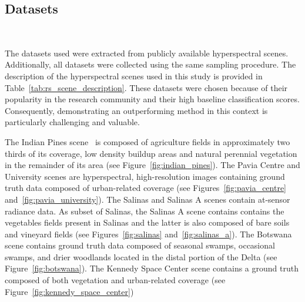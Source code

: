 \documentclass[parskip=full]{scrartcl}
\begin{document}
\subsection{Datasets}~\label{sec:datasets}

The datasets used were extracted from publicly available hyperspectral scenes.
Additionally, all datasets were collected using the same sampling procedure. The
description of the hyperspectral scenes used in this study is provided in
Table~\ref{tab:rs_scene_description}. These datasets were chosen because of
their popularity in the research community and their high baseline
classification scores. Consequently, demonstrating an outperforming method in
this context is particularly challenging and valuable.


The Indian Pines scene~\cite{Baumgardner2015} is composed of agriculture fields
in approximately two thirds of its coverage, low density buildup areas and
natural perennial vegetation in the remainder of its area (see
Figure~\ref{fig:indian_pines}). The Pavia Centre and University scenes are
hyperspectral, high-resolution images containing ground truth data composed of
urban-related coverage (see Figures~\ref{fig:pavia_centre}
and~\ref{fig:pavia_university}). The Salinas and Salinas A scenes contain
at-sensor radiance data. As subset of Salinas, the Salinas A scene contains
contains the vegetables fields present in Salinas and the latter is also
composed of bare soils and vineyard fields (see Figures~\ref{fig:salinas}
and~\ref{fig:salinas_a}). The Botswana scene contains ground truth data composed
of seasonal swamps, occasional swamps, and drier woodlands located in the distal
portion of the Delta (see Figure~\ref{fig:botswana}). The Kennedy Space Center
scene contains a ground truth composed of both vegetation and urban-related
coverage (see Figure~\ref{fig:kennedy_space_center})
\end{document}
